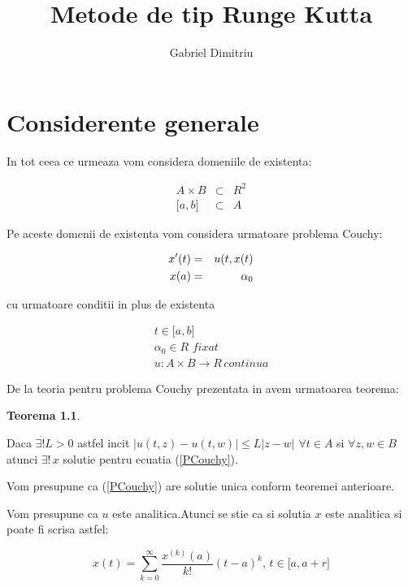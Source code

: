 \documentclass[a4paper,twoside]{book}
\newtheorem{theorem}{Teorema}
\begin{document}
\title{Metode de tip Runge Kutta}
\author{Gabriel Dimitriu}
\maketitle
\tableofcontents

\chapter{\protect\bigskip Considerente generale\label{TECouchy}}

In tot ceea ce urmeaza vom considera domeniile de existenta:

\begin{eqnarray*}
A\times B &\subset &R^{2} \\
\lbrack a,b] &\subset &A
\end{eqnarray*}

Pe aceste domenii de existenta vom considera urmatoare problema Couchy:

\begin{eqnarray}
x^{\prime }(t) &=&u(t,x(t)  \label{PCouchy} \\
x(a) &=&\alpha _{0}  \notag
\end{eqnarray}

cu urmatoare conditii in plus de existenta

\begin{gather*}
t\in \lbrack a,b] \\
\alpha _{0}\in R\,\,fixat \\
u:A\times B\rightarrow R\,continua
\end{gather*}

De la teoria pentru problema Couchy prezentata in \cite{Rosca} avem
urmatoarea teorema:

\begin{theorem}
\bigskip
\end{theorem}

Daca $\exists \dot{!}L>0$ astfel incit $|u(t,z)-u(t,w)|\leq
L|z-w|\,\,\forall t\in A$ si $\forall z,w\in B$ atunci $\exists !\,x$
solutie pentru ecuatia (\ref{PCouchy}).

Vom presupune ca (\ref{PCouchy}) are solutie unica conform teoremei
anterioare.

Vom presupune ca $u$ este analitica.Atunci se stie ca si solutia $x$ este
analitica si poate fi scrisa astfel:

\begin{equation*}
x(t)=\sum_{k=0}^{\infty }\frac{x^{(k)}(a)}{k!}(t-a)^{k},\,t\in \lbrack a,a+r]
\end{equation*}
\end{document}
